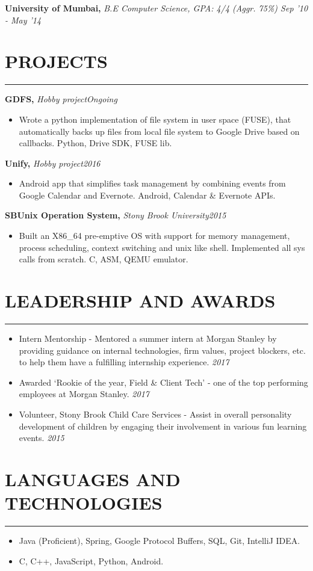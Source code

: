 \documentclass[12pt]{article}
\newcommand{\sectionHeading}[1]{
\section*{\small{#1}}
\vspace{-8pt}
\hrule
\vspace{8pt}
}
\newcommand {\projectSectionSubheading}[3]{
    \noindent \small{\textbf{#1, }\textit{#2\hfill #3} }\vspace{-6pt}
}
\newcommand{\sectionHeading}[1]{
\section*{\small{#1}}
\vspace{-8pt}
\hrule
\vspace{8pt}
}
\newcommand {\projectSectionSubheading}[3]{
    \noindent \small{\textbf{#1, }\textit{#2\hfill #3} }\vspace{-6pt}
}
\newcommand{\educationSectionSubheading}[3]{
    \noindent \small{\textbf{#1, }\textit{#2 \hfill #3}} \vspace{-20pt}\\
}
\newcommand{\sectionListStart}{\begin{itemize}[label={\small{\textbullet}},noitemsep]}
\newcommand{\sectionListEnd}{\end{itemize}}
\newcommand{\sectionListItem}[1]{\item \small{#1}}
\newcommand{\sectionListItemWithDate}[2]{\item \small{#1 \hfill \textit{#2}} \\\vspace{-10pt}}
\begin{document}
\educationSectionSubheading
{University of Mumbai}{B.E Computer Science, GPA: 4/4 (Aggr. 75\%)}{Sep '10 - May '14}


\sectionHeading{PROJECTS}
\projectSectionSubheading{GDFS}{Hobby project}{Ongoing}
\sectionListStart
    \sectionListItem
        Wrote a python implementation of file system in user space (FUSE), that automatically backs up files from local file system to Google Drive based on callbacks. Python, Drive SDK, FUSE lib.
\sectionListEnd

\projectSectionSubheading{Unify}{Hobby project}{2016}
\sectionListStart
    \sectionListItem
        Android app that simplifies task management by combining events from Google Calendar and Evernote. Android, Calendar \& Evernote APIs.
\sectionListEnd

\projectSectionSubheading{SBUnix Operation System}{Stony Brook University}{2015}
\sectionListStart
    \sectionListItem
        Built an X86\_64 pre-emptive OS with support for memory management, process scheduling, context switching and unix like shell. Implemented all sys calls from scratch. C, ASM, QEMU emulator.
        

\sectionListEnd

\sectionHeading{LEADERSHIP AND AWARDS}
\sectionListStart
    \sectionListItemWithDate
        {Intern Mentorship - Mentored a summer intern at Morgan Stanley by providing guidance on internal technologies, firm values, project blockers, etc. to help them have a fulfilling internship experience.}{2017} 
    \sectionListItemWithDate
        {Awarded `Rookie of the year, Field \& Client Tech' - one of the top performing employees at Morgan Stanley.}{2017}
    \sectionListItemWithDate
        {Volunteer, Stony Brook Child Care Services - Assist in overall personality development of children by engaging their involvement in various fun learning events.}{2015}
\sectionListEnd

\sectionHeading{LANGUAGES AND TECHNOLOGIES}
\sectionListStart
    \sectionListItem
        Java (Proficient), Spring, Google Protocol Buffers, SQL, Git, IntelliJ IDEA.
    \sectionListItem
        C, C++, JavaScript, Python, Android. 
\sectionListEnd

\end{document}
